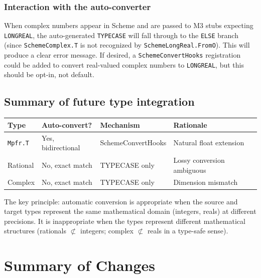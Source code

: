 \documentclass[11pt]{article}
\begin{document}
\subsubsection{Interaction with the auto-converter}

When complex numbers appear in Scheme and are passed to M3 stubs
expecting \texttt{LONGREAL}, the auto-generated \texttt{TYPECASE}
will fall through to the \texttt{ELSE} branch (since
\texttt{SchemeComplex.T} is not recognized by
\texttt{SchemeLongReal.FromO}).  This will produce a clear error
message.  If desired, a \texttt{SchemeConvertHooks} registration
could be added to convert real-valued complex numbers to
\texttt{LONGREAL}, but this should be opt-in, not default.

\subsection{Summary of future type integration}

\begin{center}
\begin{tabular}{llll}
\toprule
\textbf{Type} & \textbf{Auto-convert?} & \textbf{Mechanism} & \textbf{Rationale} \\
\midrule
\texttt{Mpfr.T}   & Yes, bidirectional & SchemeConvertHooks & Natural float extension \\
Rational           & No, exact match    & TYPECASE only      & Lossy conversion ambiguous \\
Complex            & No, exact match    & TYPECASE only      & Dimension mismatch \\
\bottomrule
\end{tabular}
\end{center}

The key principle: automatic conversion is appropriate when the source
and target types represent the same mathematical domain (integers,
reals) at different precisions.  It is inappropriate when the types
represent different mathematical structures (rationals $\not\subset$
integers; complex $\not\subset$ reals in a type-safe sense).

\section{Summary of Changes}
\end{document}
